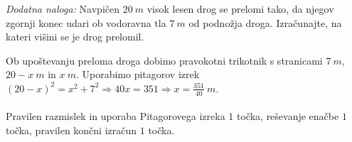 \documentclass[addpoints]{exam}
\begin{document}
\begin{questions}


    \bonusquestion[3]
    \textit{Dodatna naloga:} Navpičen $20~m$ visok lesen drog se prelomi tako, 
    da njegov zgornji konec udari ob vodoravna tla $7~m$ od podnožja droga.
    Izračunajte, na kateri višini se je drog prelomil.

    \begin{solution}[1cm]
        Ob upoštevanju preloma droga dobimo pravokotni trikotnik s stranicami $7~m$, $20-x~m$ in $x~m$.
        Uporabimo pitagorov izrek $(20-x)^2=x^2+7^2 \Rightarrow 40x=351 \Rightarrow x=\frac{351}{40}~m$. \\ \\
        Pravilen razmislek in uporaba Pitagorovega izreka $1$ točka, reševanje enačbe $1$ točka, pravilen končni izračun $1$ točka.
    \end{solution}


\end{questions}
\end{document}
